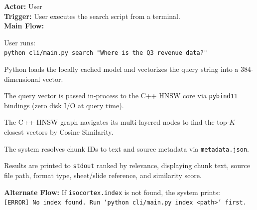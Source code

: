 \documentclass[12pt, a4paper]{article}
\begin{document}
\begin{tcolorbox}[enhanced, colback=white, colframe=ctPurple,
    colbacktitle=ctLightPurple, coltitle=ctPurple, boxrule=0.5pt,
    leftrule=4pt, arc=2mm, fonttitle=\large\bfseries,
    title={UC-2: Executing a Semantic Query},
    drop fuzzy shadow=black!5!white, top=2pt, bottom=2pt]
\textbf{Actor:} User \\[4pt]
\textbf{Trigger:} User executes the search script from a terminal. \\[4pt]
\textbf{Main Flow:}
\begin{trellolist}
    \item User runs:\\
    \texttt{python cli/main.py search "Where is the Q3 revenue data?"}
    \item Python loads the locally cached model and vectorizes the query
    string into a 384-dimensional vector.
    \item The query vector is passed in-process to the C++ HNSW core via
    \texttt{pybind11} bindings (zero disk I/O at query time).
    \item The C++ HNSW graph navigates its multi-layered nodes to find the
    top-$K$ closest vectors by Cosine Similarity.
    \item The system resolves chunk IDs to text and source metadata via
    \texttt{metadata.json}.
    \item Results are printed to \texttt{stdout} ranked by relevance,
    displaying chunk text, source file path, format type, sheet/slide
    reference, and similarity score.
\end{trellolist}
\textbf{Alternate Flow:} If \texttt{isocortex.index} is not found, the
system prints:\\
\texttt{[ERROR] No index found. Run `python cli/main.py index
\textless{}path\textgreater{}' first.}
\end{tcolorbox}

\vspace{0.4cm}
\end{document}
